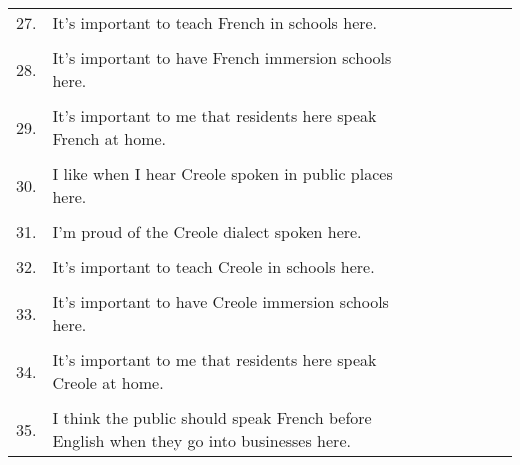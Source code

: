 \begin{longtable}[c]{| r p{} | c | c | c | c | c |}
          &                                                                           & & & & & \\
      \hline
      27. & It's important to teach French in schools here.                           & & & & & \\
          &                                                                           & & & & & \\
      \hline
      28. & It's important to have French immersion schools here.                     & & & & & \\
          &                                                                           & & & & & \\
      \hline
      29. & It's important to me that residents here speak French at home.            & & & & & \\
          &                                                                           & & & & & \\
      \hline
      30. & I like when I hear Creole spoken in public places here.                   & & & & & \\
          &                                                                           & & & & & \\
      \hline
      31. & I'm proud of the Creole dialect spoken here.                              & & & & & \\
          &                                                                           & & & & & \\
      \hline
      32. & It's important to teach Creole in schools here.                           & & & & & \\
          &                                                                           & & & & & \\
      \hline
      33. & It's important to have Creole immersion schools here.                     & & & & & \\
          &                                                                           & & & & & \\
      \hline
      34. & It's important to me that residents here speak Creole at home.         & & & & & \\
          &                                                                           & & & & & \\
      \hline
      35. & I think the public should speak French before English when they go into businesses here. & & & & & \\

\end{longtable}
